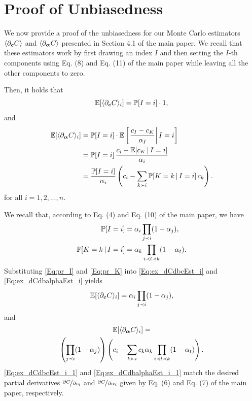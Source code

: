 \section{Proof of Unbiasedness}
\label{app:proof}
%
We now provide a proof of the unbiasedness for our Monte Carlo estimators $\langle \partial_{\boldsymbol{c}} C \rangle$ and $\langle \partial_{\boldsymbol{\alpha}} C \rangle$ presented in Section 4.1 of the main paper.
We recall that these estimators work by first drawing an index $I$ and then setting the $I$-th components using Eq. (8) and Eq. (11) of the main paper while leaving all the other components to zero.

Then, it holds that
%
\begin{equation}
    \label{Eq:ex_dCdbcEst_i}
    \mathbb{E}[\langle \partial_{\boldsymbol{c}} C \rangle_i] = \mathbb{P}[I = i] \cdot 1,
\end{equation}
%
and
%
\begin{equation}
    \label{Eq:ex_dCdbalphaEst_i}
    \begin{aligned}
        \mathbb{E}[\langle \partial_{\boldsymbol{\alpha}} C \rangle_i] &= \mathbb{P}[I = i] \cdot \mathbb{E}\left[ \left. \frac{c_I - c_K}{\alpha_I} \right| I = i \right]\\
        &= \mathbb{P}[I = i] \,\frac{c_i - \mathbb{E}[c_K \,|\, I = i]}{\alpha_i}\\
        &= \frac{\mathbb{P}[I = i]}{\alpha_i} \left( c_i - \sum_{k \succ i} \mathbb{P}[K = k \,|\, I = i] \,c_k \right).
    \end{aligned}
\end{equation}
%
for all $i = 1, 2, \ldots, n$.

We recall that, according to Eq. (4) and Eq. (10) of the main paper, we have
%
\begin{align}
    \label{Eq:pr_I}
    \mathbb{P}[I = i] &= \alpha_i \prod_{j \prec i} (1 - \alpha_j),\\
    \label{Eq:pr_K}
    \mathbb{P}[K = k \,|\, I = i] &= \alpha_k \prod_{i \prec t \prec k} (1 - \alpha_t).
\end{align}
%
Substituting \autoref{Eq:pr_I} and \autoref{Eq:pr_K} into \autoref{Eq:ex_dCdbcEst_i} and \autoref{Eq:ex_dCdbalphaEst_i} yields
%
\begin{equation}
    \label{Eq:ex_dCdbcEst_i_1}
    \mathbb{E}[\langle \partial_{\boldsymbol{c}} C \rangle_i] = \alpha_i \prod_{j \prec i} (1 - \alpha_j),
\end{equation}
%
and
%
\begin{multline}
    \label{Eq:ex_dCdbalphaEst_i_1}
    \mathbb{E}[\langle \partial_{\boldsymbol{\alpha}} C \rangle_i] =\\
    \left( \prod_{j \prec i} (1 - \alpha_j) \right) \left( c_i - \sum_{k \succ i} c_k \alpha_k \prod_{i \prec t \prec k} (1 - \alpha_t) \right).
\end{multline}
%
\autoref{Eq:ex_dCdbcEst_i_1} and \autoref{Eq:ex_dCdbalphaEst_i_1} match the desired partial derivatives $\nicefrac{\partial C}{\partial c_i}$ and $\nicefrac{\partial C}{\partial\alpha_i}$ given by Eq. (6) and Eq. (7) of the main paper, respectively.
